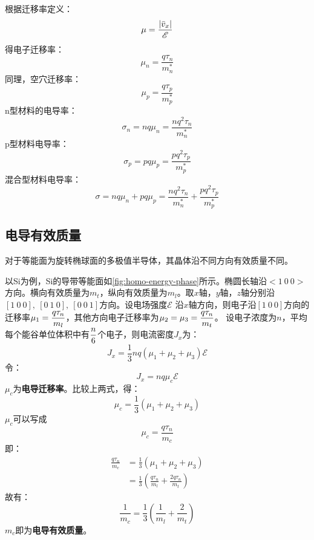 根据迁移率定义：
\begin{equation}
    \mu=\frac{\left|\Bar{v}_x\right|}{\mathscr{E}}
\end{equation}
得电子迁移率：
\begin{equation}
    \mu_n=\frac{q\tau_n}{m_n^*}
\end{equation}
同理，空穴迁移率：
\begin{equation}
    \mu_p=\frac{q\tau_p}{m_p^*}
\end{equation}
n型材料的电导率：
\begin{equation}
    \sigma_n=nq\mu_n=\frac{nq^2\tau_n}{m_n^*}
\end{equation}
p型材料电导率：
\begin{equation}
    \sigma_p=pq\mu_p=\frac{pq^2\tau_p}{m_p^*}
\end{equation}
混合型材料电导率：
\begin{equation}
    \sigma=nq\mu_n+pq\mu_p=\frac{nq^2\tau_n}{m_n^*}+\frac{pq^2\tau_p}{m_p^*}
\end{equation}

\subsection{电导有效质量}

对于等能面为旋转椭球面的多极值半导体，其晶体沿不同方向有效质量不同。

以Si为例，Si的导带等能面如\autoref{fig:homo-energy-phase}所示。椭圆长轴沿$<1\ 0\ 0>$方向。横向有效质量为$m_t$，纵向有效质量为$m_l$。取$x$轴，$y$轴，$z$轴分别沿$[1\ 0\ 0],\ [0\ 1\ 0],\ [0\ 0\ 1]$方向。设电场强度$\mathscr{E}$\vspace{1ex}
沿$x$轴方向，则电子沿$[1\ 0\ 0]$方向的迁移率$\mu_1=\displaystyle \frac{q\tau_n}{m_l}$，其他方向电子迁移率为$\mu_2=\mu_3=\displaystyle \frac{q\tau_n}{m_t}$。\vspace{1ex}
设电子浓度为$n$，平均每个能谷单位体积中有$\displaystyle \frac{n}{6}$个电子，则电流密度$J_x$为：
\begin{equation}
    J_x=\frac{1}{3}nq(\mu_1+\mu_2+\mu_3)\mathscr{E}
\end{equation}
令：
\begin{equation}
    J_x=nq\mu_c\mathscr{E}
\end{equation}
$\mu_c$为\textbf{电导迁移率}。比较上两式，得：
\begin{equation}
    \mu_c=\frac{1}{3}(\mu_1+\mu_2+\mu_3)
\end{equation}
$\mu_c$可以写成
\begin{equation}
    \mu_c=\frac{q\tau_n}{m_c}
\end{equation}
即：
\begin{align}
    \frac{q\tau_n}{m_c}&=\frac{1}{3}(\mu_1+\mu_2+\mu_3)\\
    &=\frac{1}{3}\left(\frac{q\tau_n}{m_l}+\frac{2q\tau_n}{m_t}\right)
\end{align}
故有：
\begin{equation}
    \frac{1}{m_c}=\frac{1}{3}\left(\frac{1}{m_l}+\frac{2}{m_t}\right)
\end{equation}
$m_c$即为\textbf{电导有效质量}。

